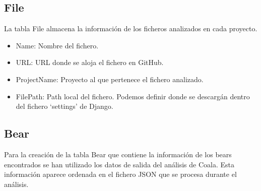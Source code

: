 \documentclass[a4paper, 12pt]{book}
\begin{document}
\subsection{File}
\label{sec:seccion14.2}
La tabla File almacena la información de los ficheros analizados en cada proyecto.

\begin{itemize}
          \item Name: Nombre del fichero.
          \item URL: URL donde se aloja el fichero en GitHub.
          \item ProjectName: Proyecto al que pertenece el fichero analizado.
          \item FilePath: Path local del fichero. Podemos definir donde se descargán dentro del fichero `settings' de Django.
\end{itemize}

\subsection{Bear}
\label{sec:seccion14.3}
Para la creación de la tabla Bear que contiene la información de los bears encontrados se han utilizado los datos de salida del análisis de Coala. Esta información aparece ordenada en el fichero JSON que se procesa durante el análisis.
\end{document}
